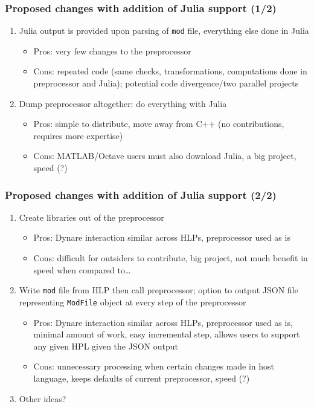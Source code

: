 \documentclass[aspectratio=169]{beamer}
\begin{document}
\begin{frame}
  \frametitle{Proposed changes with addition of Julia support (1/2)}
  \begin{enumerate}
  \item Julia output is provided upon parsing of \texttt{mod} file, everything else done in Julia
    \begin{itemize}
    \item Pros: very few changes to the preprocessor
    \item Cons: repeated code (same checks, transformations, computations done in preprocessor and Julia); potential code divergence/two parallel projects
    \end{itemize}
  \item Dump preprocessor altogether: do everything with Julia
    \begin{itemize}
    \item Pros: simple to distribute, move away from C++ (no contributions, requires more expertise)
    \item Cons: MATLAB/Octave users must also download Julia, a big project, speed (?)
    \end{itemize}
    \asuivre
  \end{enumerate}
\end{frame}

\begin{frame}
  \frametitle{Proposed changes with addition of Julia support (2/2)}
  \begin{enumerate}
    \suite
  \item Create libraries out of the preprocessor
    \begin{itemize}
    \item Pros: Dynare interaction similar across HLPs, preprocessor used as is
    \item Cons: difficult for outsiders to contribute, big project, not much benefit in speed when compared to\ldots
    \end{itemize}
  \item Write \texttt{mod} file from HLP then call preprocessor; option to output JSON file representing \texttt{ModFile} object at every step of the preprocessor
    \begin{itemize}
    \item Pros: Dynare interaction similar across HLPs, preprocessor used as is, minimal amount of work, easy incremental step, allows users to support any given HPL given the JSON output
    \item Cons: unnecessary processing when certain changes made in host language, keeps defaults of current preprocessor, speed (?)
    \end{itemize}
  \item Other ideas?
  \end{enumerate}
\end{frame}
\end{document}

